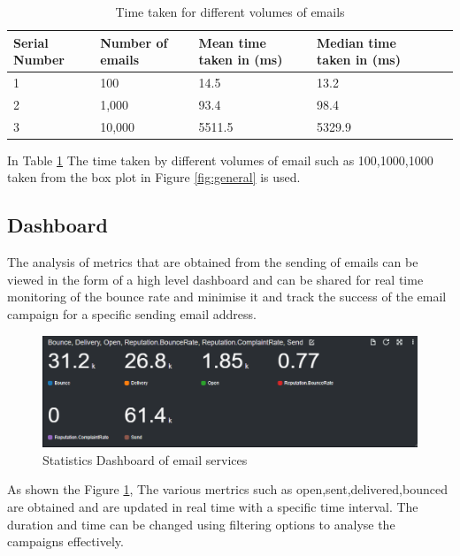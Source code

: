 \begin{table}[H]
    \centering
    \begin{tabularx}{.7\textwidth}{| X | X | X | X | X |}
        \hline
        Serial \hspace{0.2cm} Number      & Number of emails     & Mean time taken in (ms) & Median time taken in (ms)\\ \hline
        1         & 100      	  & 14.5        & 13.2     \\ \hline
        2         & 1,000         & 93.4        & 98.4   \\ \hline
        3         & 10,000        & 5511.5       & 5329.9   \\ \hline
    \end{tabularx}
    \caption{Time taken for different volumes of emails}
	    \label{table:time}
\end{table}

In Table \ref{table:time} The time taken by different volumes of email such as 100,1000,1000 taken from the box plot in Figure \ref{fig:general} is used.

\subsection{Dashboard}

The analysis of metrics that are obtained from the sending of emails can be viewed in the form of a high level dashboard and can be shared for real time monitoring of the bounce rate and minimise it and track the success of the email campaign for a specific sending email address.

\begin{figure}[H]
            \centering
            \includegraphics[width=160mm]{figures/dashboard.png}
            \caption{Statistics Dashboard of email services}
	    \label{fig:dashboard}
\end{figure}


As shown the Figure \ref{fig:dashboard}, The various mertrics such as open,sent,delivered,bounced are obtained and are updated in real time with a specific time interval. The duration and time can be changed using filtering options to analyse the campaigns effectively.
